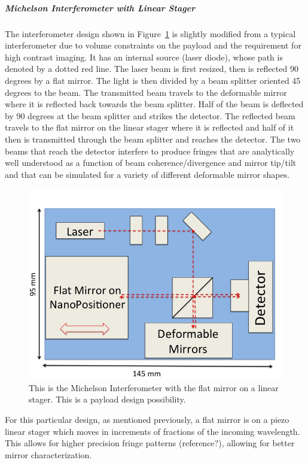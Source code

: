 \documentclass[12pt]{article}
\begin{document}
\subparagraph{Michelson Interferometer with Linear Stager}
The interferometer design shown in Figure~\ref{fig:interferometer} is slightly modified from a typical interferometer due to volume constraints on the payload and the requirement for high contrast imaging. It has an internal source (laser diode), whose path is denoted by a dotted red line.
The laser beam is first resized, then is reflected 90 degrees by a flat mirror. The light is then divided by a beam splitter oriented 45 degrees to the beam. The transmitted beam travels to the deformable mirror where it is reflected back towards the beam splitter. Half of the beam is deflected by 90 degrees at the beam splitter and strikes the detector. The reflected beam travels to the flat mirror on the linear stager where it is reflected and half of it then is transmitted through the beam splitter and reaches the detector. The two beams that reach the detector interfere to produce fringes that are analytically well understood as a function of beam coherence/divergence and mirror tip/tilt \cite{demtroeder} and that can be simulated for a variety of different deformable mirror shapes.

\begin{figure}[ht]
\centering
  \includegraphics[width=5in]{images/payload_interferometer.jpg}
\caption{This is the Michelson Interferometer with the flat mirror on a linear stager.  This is a payload design possibility.}
\label{fig:interferometer}
\end{figure}

For this particular design, as mentioned previously, a flat mirror is on a piezo linear stager which moves in increments of fractions of the incoming wavelength. This allows for higher precision fringe patterns (reference?), allowing for better mirror characterization.
\end{document}
